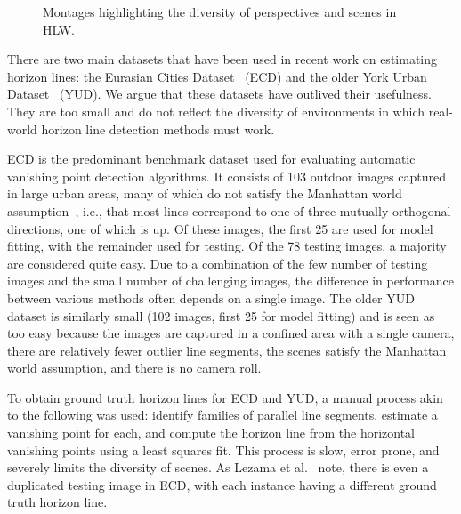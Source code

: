 \documentclass{bmvc2k}
\makeatletter
\newcommand*{\ie}{i.e.\@\xspace}
\makeatother
\begin{document}
\begin{figure}

  \centering
 

  \caption{Montages highlighting the diversity of perspectives and scenes in HLW.} 

  \label{fig:dataset}

\end{figure}

There are two main datasets that have been used in recent work on
estimating horizon lines: the Eurasian Cities
Dataset~\cite{barinova2010geometric} (ECD) and the older York Urban
Dataset~\cite{denis2008efficient} (YUD). We argue that these datasets
have outlived their usefulness. They are too small and do
not reflect the diversity of environments in which real-world
horizon line detection methods must work.

ECD is the predominant benchmark dataset used for evaluating automatic
vanishing point detection algorithms. It consists of 103 outdoor
images captured in large urban areas, many of which do not satisfy the
Manhattan world assumption~\cite{coughlan1999manhattan}, \ie, that
most lines correspond to one of three mutually orthogonal directions,
one of which is up. Of these images, the first 25 are used for model
fitting, with the remainder used for testing. Of the 78 testing
images, a majority are considered quite easy. Due to a combination of
the few number of testing images and the small number of
challenging images, the difference in performance between various
methods often depends on a single image.
The older YUD dataset is similarly small (102 images, first 25 for
model fitting) and is seen as too easy because the images are captured in a
confined area with a single camera, there are relatively fewer outlier
line segments, the scenes satisfy the Manhattan world assumption, and
there is no camera roll.  

To obtain ground truth horizon lines for ECD and YUD, a manual process
akin to the following was used: identify families of parallel line
segments, estimate a vanishing point for each, and compute the horizon
line from the horizontal vanishing points using a least squares fit.
This process is slow, error prone, and severely limits the diversity
of scenes. As Lezama et al.~\cite{lezama2014finding} note, there is
even a duplicated testing image in ECD, with each instance having a
different ground truth horizon line. 
\end{document}
